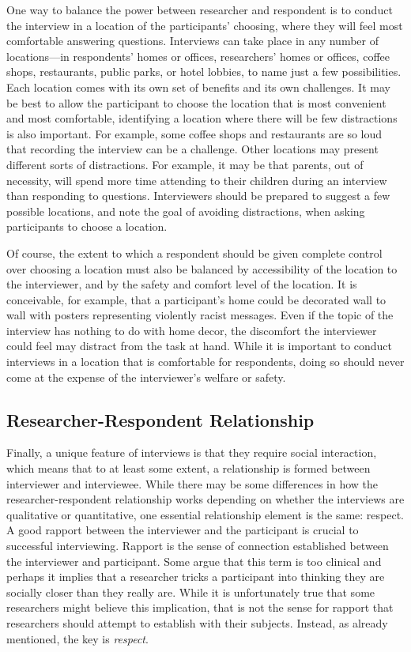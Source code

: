 One way to balance the power between researcher and respondent is to conduct the interview in a location of the participants' choosing, where they will feel most comfortable answering questions. Interviews can take place in any number of locations---in respondents' homes or offices, researchers' homes or offices, coffee shops, restaurants, public parks, or hotel lobbies, to name just a few possibilities. Each location comes with its own set of benefits and its own challenges. It may be best to allow the participant to choose the location that is most convenient and most comfortable, identifying a location where there will be few distractions is also important. For example, some coffee shops and restaurants are so loud that recording the interview can be a challenge. Other locations may present different sorts of distractions. For example, it may be that parents, out of necessity, will spend more time attending to their children during an interview than responding to questions. Interviewers should be prepared to suggest a few possible locations, and note the goal of avoiding distractions, when asking participants to choose a location.

Of course, the extent to which a respondent should be given complete control over choosing a location must also be balanced by accessibility of the location to the interviewer, and by the safety and comfort level of the location. It is conceivable, for example, that a participant's home could be decorated wall to wall with posters representing violently racist messages. Even if the topic of the interview has nothing to do with home decor, the discomfort the interviewer could feel may distract from the task at hand. While it is important to conduct interviews in a location that is comfortable for respondents, doing so should never come at the expense of the interviewer's welfare or safety.

\subsection{Researcher-Respondent Relationship}

Finally, a unique feature of interviews is that they require social interaction, which means that to at least some extent, a relationship is formed between interviewer and interviewee. While there may be some differences in how the researcher-respondent relationship works depending on whether the interviews are qualitative or quantitative, one essential relationship element is the same: respect. A good rapport between the interviewer and the participant is crucial to successful interviewing. Rapport is the sense of connection established between the interviewer and participant. Some argue that this term is too clinical and perhaps it implies that a researcher tricks a participant into thinking they are socially closer than they really are. While it is unfortunately true that some researchers might believe this implication, that is not the sense for rapport that researchers should attempt to establish with their subjects. Instead, as already mentioned, the key is \textit{respect}.

